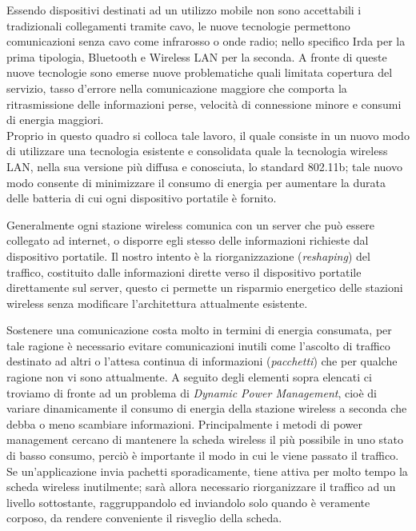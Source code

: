 Essendo dispositivi destinati ad un utilizzo mobile non sono accettabili i tradizionali collegamenti tramite
cavo, le nuove tecnologie permettono comunicazioni senza cavo come infrarosso o onde radio; nello specifico
Irda per la prima tipologia, Bluetooth e Wireless LAN per la seconda. A fronte di queste nuove tecnologie
sono emerse nuove problematiche quali limitata copertura del servizio, tasso d'errore nella comunicazione
maggiore che comporta la ritrasmissione delle informazioni perse, velocit\`a di connessione minore e consumi
di energia maggiori. \\
Proprio in questo quadro si colloca tale lavoro, il quale consiste in un nuovo modo di utilizzare una
tecnologia esistente e consolidata quale la tecnologia wireless LAN, nella sua versione pi\`u diffusa e
conosciuta, lo standard 802.11b; tale nuovo modo consente di minimizzare il consumo di energia per aumentare
la durata delle batteria di cui ogni dispositivo portatile \`e fornito.

Generalmente ogni stazione wireless comunica con un server che pu\`o essere collegato ad internet, o
disporre egli stesso delle informazioni richieste dal dispositivo portatile. Il nostro intento \`e la
riorganizzazione ({\em reshaping}) del traffico, costituito dalle informazioni dirette verso il dispositivo
portatile direttamente sul server, questo ci permette un risparmio energetico delle stazioni wireless senza
modificare l'architettura attualmente esistente.

Sostenere una comunicazione costa molto in termini di energia consumata, per tale ragione \`e necessario
evitare comunicazioni inutili come l'ascolto di traffico destinato ad altri o l'attesa continua di
informazioni ({\em pacchetti}) che per qualche ragione non vi sono attualmente. A seguito degli elementi
sopra elencati ci troviamo di fronte ad un problema di {\em Dynamic Power Management}, cio\`e di variare
dinamicamente il consumo di energia della stazione wireless a seconda che debba o meno scambiare
informazioni. Principalmente i metodi di power management cercano di mantenere la scheda wireless il pi\`u
possibile in uno stato di basso consumo, perci\`o \`e importante il modo in cui le viene passato il
traffico. Se un'applicazione invia pachetti sporadicamente, tiene attiva per molto tempo la scheda
wireless inutilmente; sar\`a allora necessario riorganizzare il traffico ad un livello sottostante,
raggruppandolo ed inviandolo solo quando \`e veramente corposo, da rendere conveniente il risveglio della
scheda.

